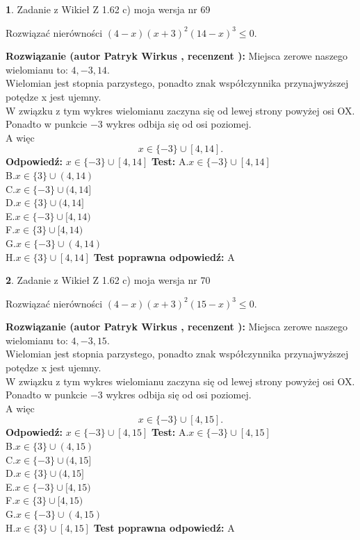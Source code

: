 \documentclass[12pt, a4paper]{article}
\theoremstyle{definition} %
\newtheorem{zad}{}
\newcommand{\zadStart}[1]{\begin{zad}#1\newline}
\newcommand{\zadStop}{\end{zad}}
\newcommand{\rozwStart}[2]{\noindent \textbf{Rozwiązanie (autor #1 , recenzent #2): }\newline}
\newcommand{\rozwStop}{\newline}
\newcommand{\odpStart}{\noindent \textbf{Odpowiedź:}\newline}
\newcommand{\odpStop}{\newline}
\newcommand{\testStart}{\noindent \textbf{Test:}\newline}
\newcommand{\testStop}{\newline}
\newcommand{\kluczStart}{\noindent \textbf{Test poprawna odpowiedź:}\newline}
\newcommand{\kluczStop}{\newline}
\begin{document}
\zadStart{Zadanie z Wikieł Z 1.62 c) moja wersja nr 69}

Rozwiązać nierówności $(4-x)(x+3)^{2}(14-x)^{3}\le0$.
\zadStop
\rozwStart{Patryk Wirkus}{}
Miejsca zerowe naszego wielomianu to: $4, -3, 14$.\\
Wielomian jest stopnia parzystego, ponadto znak współczynnika przy\linebreak najwyższej potędze x jest ujemny.\\ W związku z tym wykres wielomianu zaczyna się od lewej strony powyżej osi OX.\\
Ponadto w punkcie $-3$ wykres odbija się od osi poziomej.\\
A więc $$x \in \{-3\} \cup [4,14].$$
\rozwStop
\odpStart
$x \in \{-3\} \cup [4,14]$
\odpStop
\testStart
A.$x \in \{-3\} \cup [4,14]$\\
B.$x \in \{3\} \cup (4,14)$\\
C.$x \in \{-3\} \cup (4,14]$\\
D.$x \in \{3\} \cup (4,14]$\\
E.$x \in \{-3\} \cup [4,14)$\\
F.$x \in \{3\} \cup [4,14)$\\
G.$x \in \{-3\} \cup (4,14)$\\
H.$x \in \{3\} \cup [4,14]$
\testStop
\kluczStart
A
\kluczStop



\zadStart{Zadanie z Wikieł Z 1.62 c) moja wersja nr 70}

Rozwiązać nierówności $(4-x)(x+3)^{2}(15-x)^{3}\le0$.
\zadStop
\rozwStart{Patryk Wirkus}{}
Miejsca zerowe naszego wielomianu to: $4, -3, 15$.\\
Wielomian jest stopnia parzystego, ponadto znak współczynnika przy\linebreak najwyższej potędze x jest ujemny.\\ W związku z tym wykres wielomianu zaczyna się od lewej strony powyżej osi OX.\\
Ponadto w punkcie $-3$ wykres odbija się od osi poziomej.\\
A więc $$x \in \{-3\} \cup [4,15].$$
\rozwStop
\odpStart
$x \in \{-3\} \cup [4,15]$
\odpStop
\testStart
A.$x \in \{-3\} \cup [4,15]$\\
B.$x \in \{3\} \cup (4,15)$\\
C.$x \in \{-3\} \cup (4,15]$\\
D.$x \in \{3\} \cup (4,15]$\\
E.$x \in \{-3\} \cup [4,15)$\\
F.$x \in \{3\} \cup [4,15)$\\
G.$x \in \{-3\} \cup (4,15)$\\
H.$x \in \{3\} \cup [4,15]$
\testStop
\kluczStart
A
\kluczStop
\end{document}
